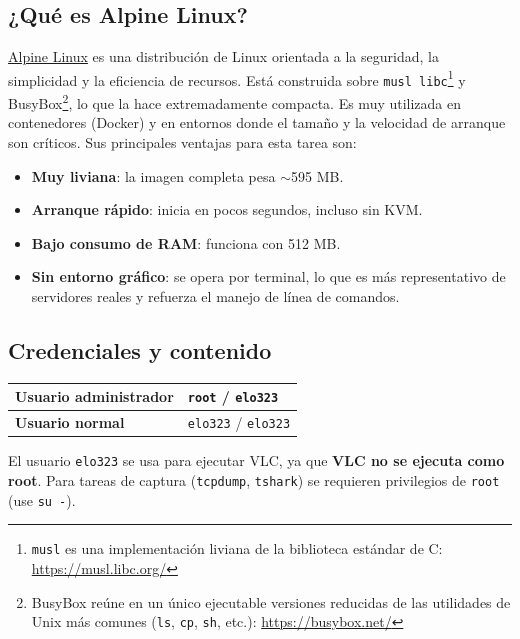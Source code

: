 \documentclass[letterpaper,12pt]{article}
\begin{document}
\subsection{¿Qué es Alpine Linux?}

\href{https://alpinelinux.org/}{Alpine Linux} es una distribución de Linux orientada a la seguridad, la simplicidad y la eficiencia de recursos. Está construida sobre \texttt{musl libc}\footnote{\texttt{musl} es una implementación liviana de la biblioteca estándar de C: \url{https://musl.libc.org/}} y BusyBox\footnote{BusyBox reúne en un único ejecutable versiones reducidas de las utilidades de Unix más comunes (\texttt{ls}, \texttt{cp}, \texttt{sh}, etc.): \url{https://busybox.net/}}, lo que la hace extremadamente compacta. Es muy utilizada en contenedores (Docker) y en entornos donde el tamaño y la velocidad de arranque son críticos. Sus principales ventajas para esta tarea son:

\begin{itemize}
    \item \textbf{Muy liviana}: la imagen completa pesa $\sim$595 MB.
    \item \textbf{Arranque rápido}: inicia en pocos segundos, incluso sin KVM.
    \item \textbf{Bajo consumo de RAM}: funciona con 512 MB.
    \item \textbf{Sin entorno gráfico}: se opera por terminal, lo que es más representativo de servidores reales y refuerza el manejo de línea de comandos.
\end{itemize}

\subsection{Credenciales y contenido}

\begin{center}
\begin{tabular}{|l|l|}
    \hline
    \textbf{Usuario administrador} & \texttt{root} / \texttt{elo323} \\ \hline
    \textbf{Usuario normal}        & \texttt{elo323} / \texttt{elo323} \\ \hline
\end{tabular}
\end{center}

\begin{nota}
El usuario \texttt{elo323} se usa para ejecutar VLC, ya que \textbf{VLC no se ejecuta como root}. Para tareas de captura (\texttt{tcpdump}, \texttt{tshark}) se requieren privilegios de \texttt{root} (use \texttt{su -}).
\end{nota}
\end{document}
